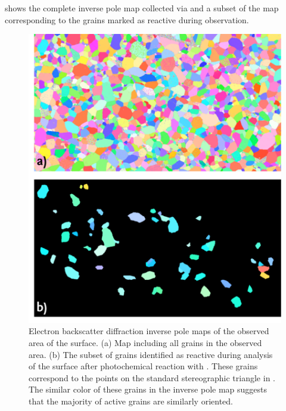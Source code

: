  shows the complete inverse pole map collected via  and a
subset of the map corresponding to the grains marked as reactive during 
observation.
\begin{figure}
	\includegraphics[width=\textwidth]{ebsdmapssem.pdf} %
	\caption[Inverse pole maps of  surface]{%
		Electron backscatter diffraction inverse pole maps of the 
		observed area of the  surface. (a) Map including 
		all grains in the observed area. (b) The subset of grains 
		identified as reactive during  analysis of the surface 
		after photochemical reaction with . These grains 
		correspond to the points on the standard stereographic triangle 
		in . The similar color of these 
		grains in the inverse pole map suggests that the majority 
		of active grains are similarly oriented. }
\label{fig:ebsdmapsem}
\end{figure}

